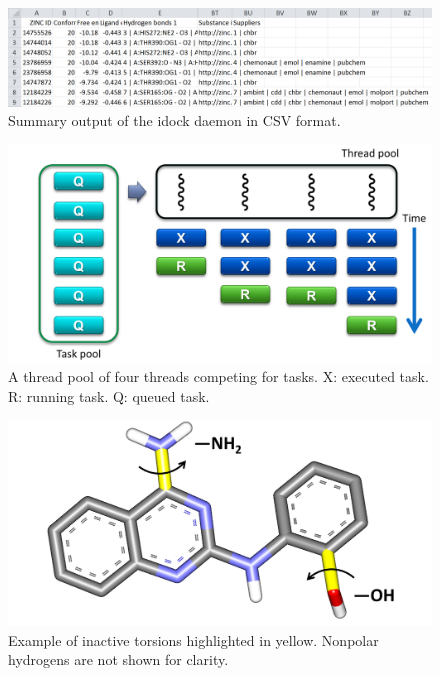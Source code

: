 \documentclass[12pt]{article}
\begin{document}
\clearpage

\begin{figure}
\begin{center}
\includegraphics[width=\linewidth,keepaspectratio=true]{OutputCSV.png}
\caption{\label{OutputCSV} Summary output of the idock daemon in CSV format.}
\end{center}
\end{figure}

\clearpage

\begin{figure}
\begin{center}
\includegraphics[width=\linewidth]{ThreadPool.png}
\caption{A thread pool of four threads competing for tasks. X: executed task. R: running task. Q: queued task.}
\label{ThreadPool}
\end{center}
\end{figure}

\clearpage

\begin{figure}
\begin{center}
\includegraphics[width=\linewidth]{InactiveTorsions.png}
\caption{Example of inactive torsions highlighted in yellow. Nonpolar hydrogens are not shown for clarity.}
\label{InactiveTorsions}
\end{center}
\end{figure}
\end{document}
